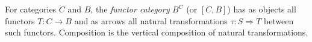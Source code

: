 For categories $C$ and $B$, the \emph{functor category} $B^C$ (or $[C, B]$) has as objects all functors $T: C \to B$ and as arrows all natural transformations $\tau: S \Rightarrow T$ between such functors. Composition is the vertical composition of natural transformations.
